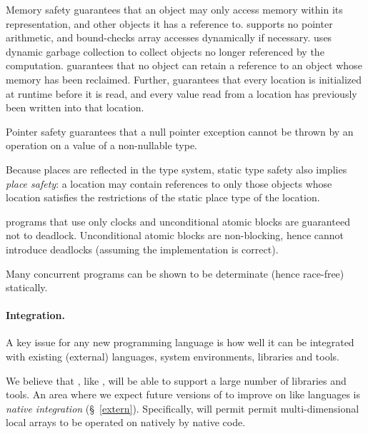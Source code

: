 Memory safety guarantees that an object may only access memory within
its representation, and other objects it has a reference to. \Xten{}
supports no pointer arithmetic, and bound-checks array accesses
dynamically if necessary. \Xten{} uses dynamic garbage collection to
collect objects no longer referenced by the computation. \Xten{}
guarantees that no object can retain a reference to an object
whose memory has been reclaimed.  Further, \Xten{} guarantees that
every location is initialized at runtime before it is read, 
and every value read from a location has previously been written into
that location. 

Pointer safety guarantees that a null pointer exception cannot be
thrown by an operation on a value of a non-nullable type.

Because places are reflected in the type system, static type safety
also implies \emph{place safety}: a location may contain references to only
those objects whose location satisfies the restrictions of the static
place type of the location.

\Xten{} programs that use only clocks and unconditional atomic
blocks are guaranteed not to deadlock. Unconditional atomic blocks
are non-blocking, hence cannot introduce deadlocks (assuming the
implementation is correct).

Many concurrent programs can be shown to be determinate (hence
race-free) statically.

\paragraph{Integration.}
A key issue for any new programming language is how well it can be
integrated with existing (external) languages, system environments,
libraries and tools.

We believe that \Xten{}, like \java{}, will be able to support a large
number of libraries and tools. An area where we expect future versions
of \Xten{} to improve on \java{} like languages is \emph{native
integration} (\S~\ref{extern}). Specifically, \Xten{} will permit
permit multi-dimensional local arrays to be operated on natively by
native code.

